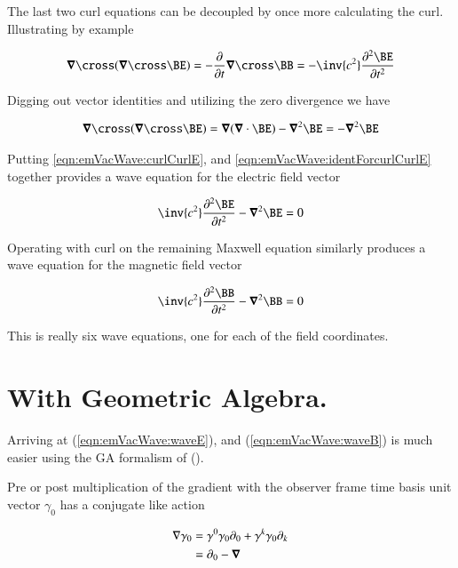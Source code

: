 The last two curl equations can be decoupled by once more calculating the curl.
Illustrating by example

\begin{align}\label{eqn:emVacWave:curlCurlE}
\spacegrad \cross (\spacegrad \cross \BE) = -\frac{\partial }{\partial t} \spacegrad \cross \BB = -\inv{c^2} \frac{\partial^2 \BE}{\partial t^2}
\end{align}

Digging out vector identities and utilizing the zero divergence we have

\begin{align}\label{eqn:emVacWave:identForcurlCurlE}
\spacegrad \cross (\spacegrad \cross \BE) = \spacegrad (\spacegrad \cdot \BE) - \spacegrad^2 \BE = -\spacegrad^2 \BE
\end{align}

Putting \ref{eqn:emVacWave:curlCurlE}, and \ref{eqn:emVacWave:identForcurlCurlE} together provides a wave equation for the electric field vector

\begin{align}\label{eqn:emVacWave:waveE}
\inv{c^2} \frac{\partial^2 \BE}{\partial t^2} - \spacegrad^2 \BE = 0
\end{align}

Operating with curl on the remaining Maxwell equation similarly produces a wave equation for the magnetic field vector

\begin{align}\label{eqn:emVacWave:waveB}
\inv{c^2} \frac{\partial^2 \BB}{\partial t^2} - \spacegrad^2 \BB = 0
\end{align}

This is really six wave equations, one for each of the field coordinates.

\section{With Geometric Algebra.}

Arriving at (\ref{eqn:emVacWave:waveE}), and (\ref{eqn:emVacWave:waveB}) is much easier using the GA formalism of (\cite{doran2003gap}).

Pre or post multiplication of the gradient with the observer frame time basis unit vector $\gamma_0$ has a conjugate like
action

\begin{align*}
\nabla \gamma_0
&=
\gamma^0 \gamma_0 \partial_0 + \gamma^k \gamma_0 \partial_k \\
&=
\partial_0 - \boldsymbol{\nabla} \\
\end{align*}

